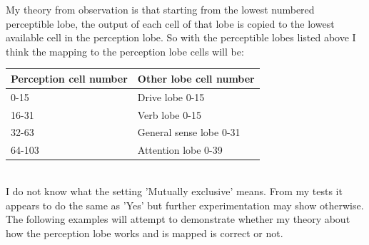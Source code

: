 \documentclass[11pt,twoside,a4paper]{article}
\begin{document}
\begin{minipage}[h]{9.00cm}
	My theory from observation is that starting from the lowest numbered perceptible lobe, the output of each cell of that lobe is copied to the lowest available cell in the perception lobe. So with the perceptible lobes listed above I think the mapping to the perception lobe cells will be: ~\\
\end{minipage} \hfill \begin{minipage}[h]{9.65cm}
	\begin{tabular}[h]{|p{4.75cm}|p{4.50cm}|}
		\hline
		\textbf{Perception cell number}	&	\textbf{Other lobe cell number}	\\ \hline
		0-15							&	Drive lobe 0-15					\\ \hline
		16-31							&	Verb lobe 0-15					\\ \hline
		32-63							&	General sense lobe 0-31			\\ \hline
		64-103							&	Attention lobe 0-39				\\ \hline
	\end{tabular}
\end{minipage} ~\\

I do not know what the setting 'Mutually exclusive' means. From my tests it appears to do the same as 'Yes' but further experimentation may show otherwise. The following examples will attempt to demonstrate whether my theory about how the perception lobe works and is mapped is correct or not. ~\\
\end{document}
